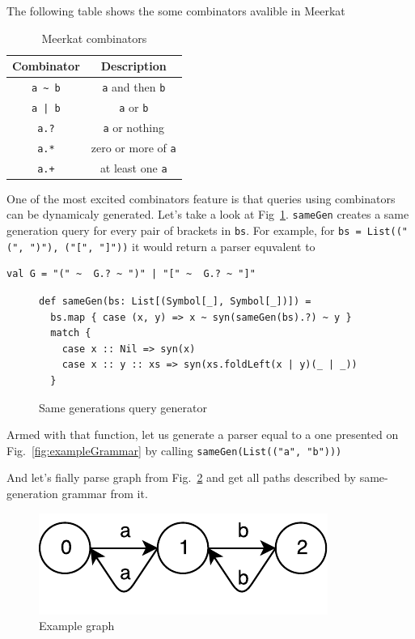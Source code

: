 The following table shows the some combinators avalible in Meerkat 

\begin{table}[h]
\centering
\begin{tabular}{|c|c|}
\hline
\multicolumn{1}{|c|}{Combinator} & \multicolumn{1}{c|}{Description} \\ \hline
{\lstinline!a ~ b!} & {\lstinline!a!} and then {\lstinline!b!}   \\
{\lstinline!a | b!} & {\lstinline!a!} or {\lstinline!b!}         \\
{\lstinline!a.?!}   & {\lstinline!a!} or nothing   \\
{\lstinline!a.*!}   & zero or more of {\lstinline!a!} \\
{\lstinline!a.+!}   & at least one {\lstinline!a!} \\
\hline
\end{tabular}
\caption{Meerkat combinators}
\label{table:combinators}
\end{table}

One of the most excited combinators feature is that queries using combinators can be dynamicaly generated. Let's take a look at Fig~\ref{fig:gen}. \lstinline{sameGen} creates a same generation query for every pair of brackets in \lstinline{bs}. For example, for \lstinline{bs = List(("(", ")"), ("[", "]"))} it would return a parser equvalent to 
\begin{lstlisting}
val G = "(" ~  G.? ~ ")" | "[" ~  G.? ~ "]"
\end{lstlisting}

\begin{figure}[h]
\begin{lstlisting}
def sameGen(bs: List[(Symbol[_], Symbol[_])]) =
  bs.map { case (x, y) => x ~ syn(sameGen(bs).?) ~ y } 
  match {
    case x :: Nil => syn(x)
    case x :: y :: xs => syn(xs.foldLeft(x | y)(_ | _))
  }
\end{lstlisting}
\caption{Same generations query generator}
\label{fig:gen}
\end{figure}

Armed with that function, let us generate a parser equal to a one presented on Fig.~\ref{fig:exampleGrammar} by calling \lstinline{sameGen(List(("a", "b")))}

And let's fially parse graph from Fig.~\ref{fig:graph} and get all paths described by same-generation grammar from it.

\begin{figure}[h]
\includegraphics{graph}
\caption{Example graph}
\label{fig:graph}
\end{figure}

